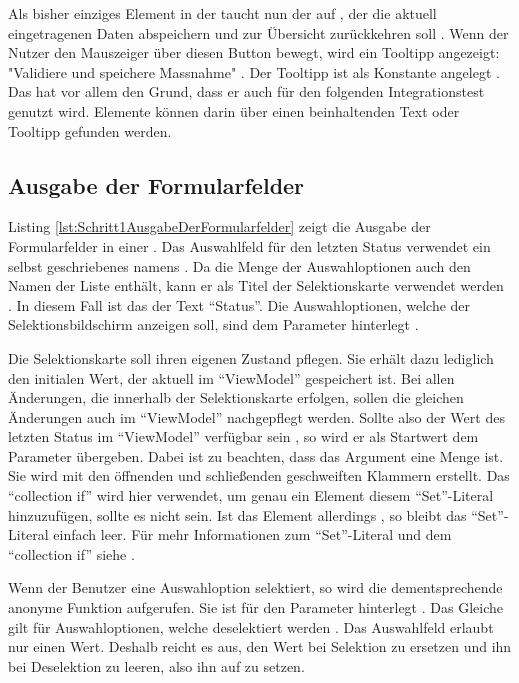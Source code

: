 Als bisher einziges Element in der   taucht nun der  auf ,
der die aktuell eingetragenen Daten abspeichern  und zur Übersicht zurückkehren soll .
Wenn der Nutzer den Mauszeiger über diesen Button bewegt,
wird ein Tooltipp angezeigt: "Validiere und speichere Massnahme" .
Der Tooltipp ist als Konstante angelegt .
Das hat vor allem den Grund,
dass er auch für den folgenden Integrationstest genutzt wird. Elemente können darin über einen beinhaltenden Text oder Tooltipp gefunden werden.




\subsection{Ausgabe der Formularfelder}

Listing \ref{lst:Schritt1AusgabeDerFormularfelder} zeigt die Ausgabe der Formularfelder in einer  .
Das Auswahlfeld für den letzten Status verwendet ein selbst geschriebenes  namens  .
Da die Menge der Auswahloptionen auch den Namen der Liste enthält, kann er als Titel der Selektionskarte verwendet werden . In diesem Fall ist das der Text \enquote{Status}.
Die Auswahloptionen, welche der Selektionsbildschirm anzeigen soll, sind dem Parameter  hinterlegt .

Die Selektionskarte soll ihren eigenen Zustand pflegen.
Sie erhält dazu lediglich den initialen Wert, der aktuell im \enquote{ViewModel} gespeichert ist.
Bei allen Änderungen, die innerhalb der Selektionskarte erfolgen, sollen die gleichen Änderungen auch im \enquote{ViewModel} nachgepflegt werden.
Sollte also der Wert des letzten Status im \enquote{ViewModel} verfügbar sein , so wird er als Startwert dem Parameter   übergeben.
Dabei ist zu beachten, dass das Argument eine Menge ist.
Sie wird mit den  öffnenden und schließenden geschweiften Klammern erstellt.
Das \enquote{collection if} wird hier verwendet, um genau ein Element diesem \enquote{Set}-Literal hinzuzufügen, sollte es nicht  sein.
Ist das Element allerdings , so bleibt das \enquote{Set}-Literal einfach leer.
Für mehr Informationen zum \enquote{Set}-Literal und dem \enquote{collection if} siehe .


Wenn der Benutzer eine Auswahloption selektiert, so  wird die dementsprechende anonyme Funktion aufgerufen.
Sie ist für den Parameter  hinterlegt .
Das Gleiche gilt für Auswahloptionen, welche deselektiert werden .
Das Auswahlfeld erlaubt nur einen Wert.
Deshalb reicht es aus, den Wert bei Selektion zu ersetzen und ihn bei Deselektion zu leeren, also ihn auf  zu setzen.

